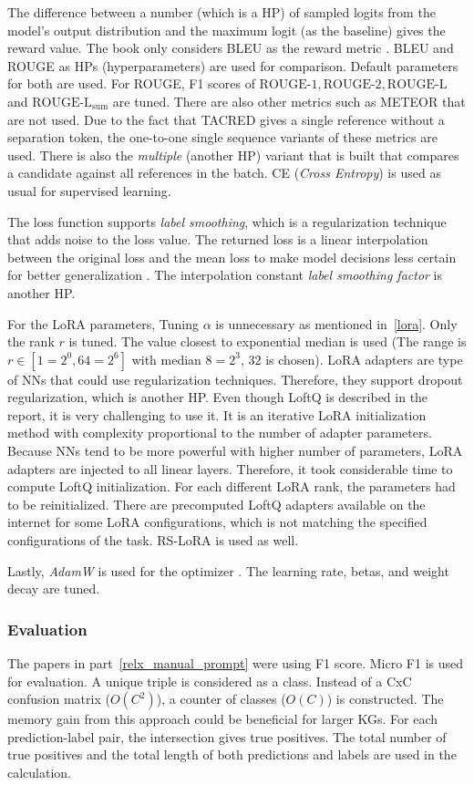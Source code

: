 \documentclass{article}
\begin{document}
The difference between a number (which is a HP) of sampled logits from the model's output distribution and the maximum logit (as the baseline) gives the reward value. The book only considers BLEU as the reward metric \cite{lapan_deep_2020}. BLEU and ROUGE as HPs (hyperparameters) are used for comparison. Default parameters for both are used. For ROUGE, F1 scores of $\text{ROUGE-1}, \text{ROUGE-2}, \text{ROUGE-L}$ and $\text{ROUGE-L}_{\text{sum}}$ are tuned. There are also other metrics such as METEOR that are not used. Due to the fact that TACRED gives a single reference without a separation token, the one-to-one single sequence variants of these metrics are used. There is also the \textit{multiple} (another HP) variant that is built that compares a candidate against all references in the batch. CE (\textit{Cross Entropy}) is used as usual for supervised learning.

The loss function supports \textit{label smoothing}, which is a regularization technique that adds noise to the loss value. The returned loss is a linear interpolation between the original loss and the mean loss to make model decisions less certain for better generalization \cite{muller_when_2020}. The interpolation constant \textit{label smoothing factor} is another HP.

For the LoRA parameters, Tuning $\alpha$ is unnecessary as mentioned in~\ref{lora}. Only the rank $r$ is tuned. The value closest to exponential median is used (The range is $r \in [1=2^0, 64=2^6]$ with median $8=2^3$, $32$ is chosen). LoRA adapters are type of NNs that could use regularization techniques. Therefore, they support dropout regularization, which is another HP. Even though LoftQ is described in the report, it is very challenging to use it. It is an iterative LoRA initialization method with complexity proportional to the number of adapter parameters. Because NNs tend to be more powerful with higher number of parameters, LoRA adapters are injected to all linear layers. Therefore, it took considerable time to compute LoftQ initialization. For each different LoRA rank, the parameters had to be reinitialized. There are precomputed LoftQ adapters available on the internet for some LoRA configurations, which is not matching the specified configurations of the task. RS-LoRA is used as well.

Lastly, \textit{AdamW} is used for the optimizer \cite{loshchilov_decoupled_2019}. The learning rate, betas, and weight decay are tuned.
\subsubsection{Evaluation}
The papers in part~\ref{relx_manual_prompt} were using F1 score. Micro F1 is used for evaluation. A unique triple is considered as a class. Instead of a CxC confusion matrix ($O(C^2)$), a counter of classes ($O(C)$) is constructed. The memory gain from this approach could be beneficial for larger KGs. For each prediction-label pair, the intersection gives true positives. The total number of true positives and the total length of both predictions and labels are used in the calculation.
\end{document}
